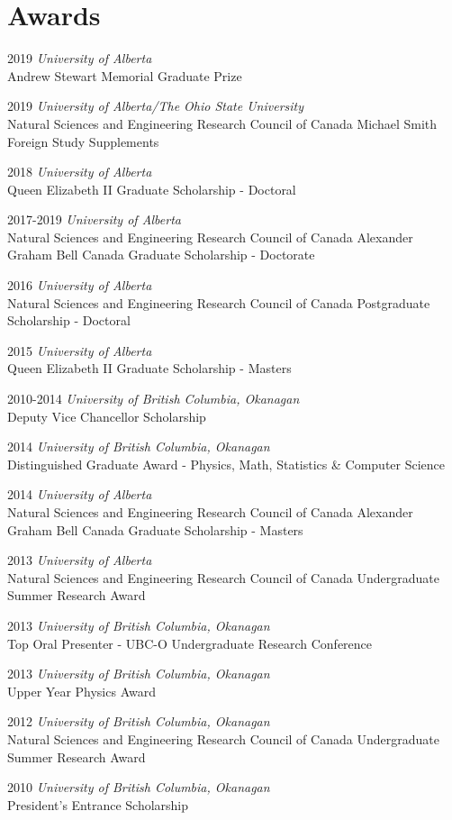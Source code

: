 \documentclass[letterpaper,11pt]{article}
\newlength{\mainindent} \setlength{\mainindent}{12pt}
\newlength{\contentindent} \setlength{\contentindent}{19ex}
\newenvironment{datelist}{
  \begingroup
  \raggedright
  \begin{description}[labelindent=\mainindent,leftmargin=\contentindent,
      style=sameline,font=\normalfont,topsep=0pt,partopsep=0pt,parsep=0pt,
      itemsep=4pt]
}{
  \end{description}
  \endgroup
}
\begin{document}
\section*{Awards}
\begin{datelist}
\item[2019] \emph{University of Alberta} \\ Andrew Stewart Memorial Graduate Prize
\item[2019] \emph{University of Alberta/The Ohio State University} \\ Natural Sciences and Engineering Research Council of Canada Michael Smith Foreign Study Supplements
\item[2018] \emph{University of Alberta} \\ Queen Elizabeth II Graduate Scholarship - Doctoral
\item[2017-2019] \emph{University of Alberta} \\ Natural Sciences and Engineering Research Council of Canada Alexander Graham Bell Canada Graduate Scholarship - Doctorate
\item[2016] \emph{University of Alberta} \\ Natural Sciences and Engineering Research Council of Canada Postgraduate Scholarship - Doctoral
\item[2015] \emph{University of Alberta} \\ Queen Elizabeth II Graduate Scholarship - Masters
\item[2010-2014] \emph{University of British Columbia, Okanagan} \\ Deputy Vice Chancellor Scholarship
\item[2014] \emph{University of British Columbia, Okanagan} \\ Distinguished Graduate Award - Physics, Math, Statistics \& Computer Science
\item[2014] \emph{University of Alberta} \\ Natural Sciences and Engineering Research Council of Canada Alexander Graham Bell Canada Graduate Scholarship - Masters
\item[2013] \emph{University of Alberta} \\ Natural Sciences and Engineering Research Council of Canada Undergraduate Summer Research Award
\item[2013] \emph{University of British Columbia, Okanagan} \\ Top Oral Presenter - UBC-O Undergraduate Research Conference
\item[2013] \emph{University of British Columbia, Okanagan} \\ Upper Year Physics Award
\item[2012] \emph{University of British Columbia, Okanagan} \\ Natural Sciences and Engineering Research Council of Canada Undergraduate Summer Research Award
\item[2010] \emph{University of British Columbia, Okanagan} \\ President's Entrance Scholarship
\end{datelist}
\end{document}
